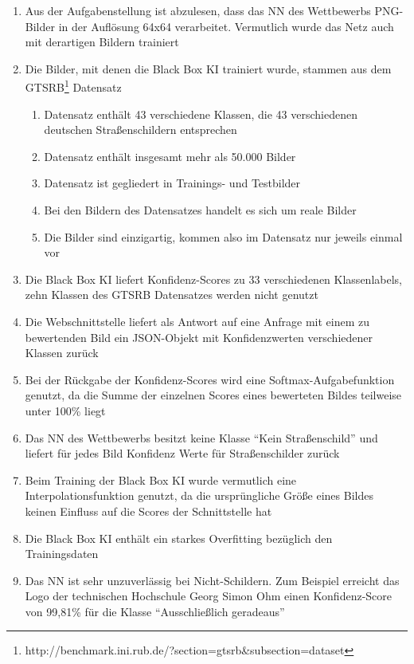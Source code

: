 \begin{enumerate}
	\item Aus der Aufgabenstellung ist abzulesen, dass das \ac{NN} des Wettbewerbs PNG-Bilder in der Auflösung 64x64 verarbeitet. Vermutlich wurde das Netz auch mit derartigen Bildern trainiert
	\item Die Bilder, mit denen die Black Box \ac{KI} trainiert wurde, stammen aus dem GTSRB\footnote{http://benchmark.ini.rub.de/?section=gtsrb\&subsection=dataset} Datensatz
	\begin{enumerate}
		\item Datensatz enthält 43 verschiedene Klassen, die 43 verschiedenen deutschen Straßenschildern entsprechen
		\item Datensatz enthält insgesamt mehr als 50.000 Bilder
		\item Datensatz ist gegliedert in Trainings- und Testbilder
		\item Bei den Bildern des Datensatzes handelt es sich um reale Bilder
		\item Die Bilder sind einzigartig, kommen also im Datensatz nur jeweils einmal vor
	\end{enumerate}
	\item Die Black Box \ac{KI} liefert Konfidenz-Scores zu 33 verschiedenen Klassenlabels, zehn Klassen des \ac{GTSRB} Datensatzes werden nicht genutzt
	\item Die Webschnittstelle liefert als Antwort auf eine Anfrage mit einem zu bewertenden Bild ein JSON-Objekt mit Konfidenzwerten verschiedener Klassen zurück
	\item Bei der Rückgabe der Konfidenz-Scores wird eine Softmax-Aufgabefunktion genutzt, da die Summe der einzelnen Scores eines bewerteten Bildes teilweise unter 100\% liegt
	\item Das \ac{NN} des Wettbewerbs besitzt keine Klasse "`Kein Straßenschild"' und liefert für jedes Bild Konfidenz Werte für Straßenschilder zurück
	\item Beim Training der Black Box \ac{KI} wurde vermutlich eine Interpolationsfunktion genutzt, da die ursprüngliche Größe eines Bildes keinen Einfluss auf die Scores der Schnittstelle hat  
	\item Die Black Box \ac{KI} enthält ein starkes Overfitting bezüglich den Trainingsdaten
	\item Das \ac{NN} ist sehr unzuverlässig bei Nicht-Schildern. Zum Beispiel erreicht das Logo der technischen Hochschule Georg Simon Ohm einen Konfidenz-Score von 99,81\% für die Klasse "`Ausschließlich geradeaus"'
\end{enumerate}


